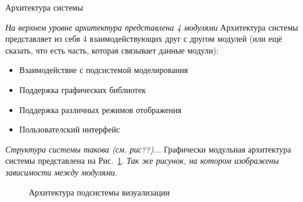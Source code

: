 \documentclass[a4paper,12pt]{extarticle}
\begin{document}
\begin{section}{Архитектура системы}

\textit{На верхнем уровне архитектура представлена 4 модулями}
Архитектура системы представляет из себя 4 взаимодействующих друг с другом модулей (или ещё сказать, что есть часть, которая связывает данные модули):
\begin{itemize}
    \item Взаимодействие с подсистемой моделирования
    \item Поддержка графических библиотек
    \item Поддержка различных режимов отображения
    \item Пользователский интерфейс
\end{itemize}
\textit{Структура системы такова (см. рис??)...} Графически модульная архитектура системы представлена на Рис.~\ref{ris:architecture-all}. \textit{Так же рисунок, на котором изображены зависимости между модулями}.

\begin{figure}[h]
    \caption{Архитектура подсистемы визуализации}
    \label{ris:architecture-all}
\end{figure}


\end{section}
\end{document}
